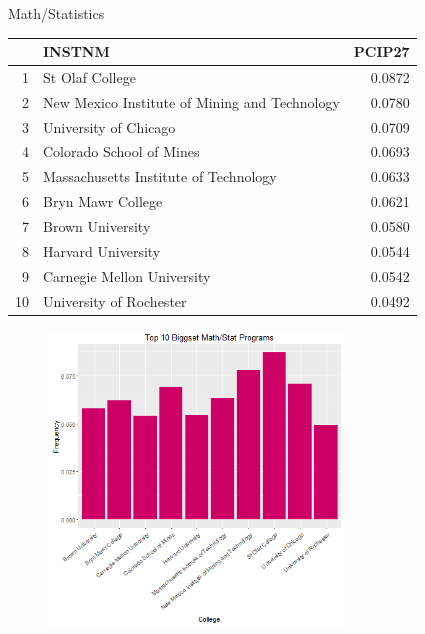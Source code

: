 \documentclass{article}
\begin{document}
Math/Statistics
\begin{table}[ht]
\centering
\begin{tabular}{rlr}
  \hline
 & INSTNM & PCIP27 \\ 
  \hline
1 & St Olaf College & 0.0872 \\ 
  2 & New Mexico Institute of Mining and Technology & 0.0780 \\ 
  3 & University of Chicago & 0.0709 \\ 
  4 & Colorado School of Mines & 0.0693 \\ 
  5 & Massachusetts Institute of Technology & 0.0633 \\ 
  6 & Bryn Mawr College & 0.0621 \\ 
  7 & Brown University & 0.0580 \\ 
  8 & Harvard University & 0.0544 \\ 
  9 & Carnegie Mellon University & 0.0542 \\ 
  10 & University of Rochester & 0.0492 \\ 
   \hline
\end{tabular}
\end{table}
\begin{figure}[H]
\includegraphics[width=0.7\textwidth]{../images/biggestMathStat.png}
\end{figure}

\clearpage
\end{document}
